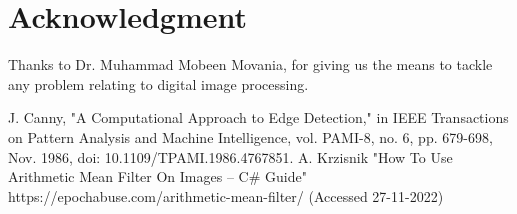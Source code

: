 \documentclass[conference]{IEEEtran}
\begin{document}
\section*{Acknowledgment}
Thanks to Dr. Muhammad Mobeen Movania, for giving us the means to tackle any problem relating to digital image processing.


\begin{thebibliography}{00}
 J. Canny, "A Computational Approach to Edge Detection," in IEEE Transactions on Pattern Analysis and Machine Intelligence, vol. PAMI-8, no. 6, pp. 679-698, Nov. 1986, doi: 10.1109/TPAMI.1986.4767851.
A. Krzisnik "How To Use Arithmetic Mean Filter On Images – C\# Guide" 
https://epochabuse.com/arithmetic-mean-filter/ (Accessed 27-11-2022)
\end{thebibliography}
\end{document}
